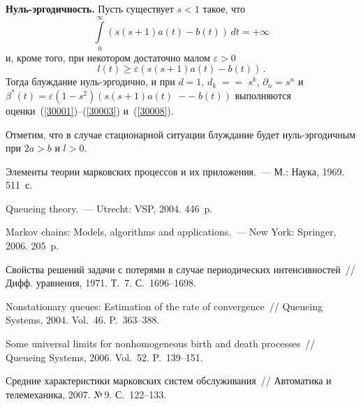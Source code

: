 \begin{multicols}{2}
{\bf Нуль-эргодичность.} Пусть существует $s<1$ такое, что
\begin{equation*}
 \int\limits_{0}^{\infty}\left(s(s+1)a(t) - b(t)\right)\, dt=+\infty
\end{equation*} 
и, кроме того, при некотором достаточно
малом $\varepsilon > 0$ 
\begin{equation*} 
l(t) \ge \varepsilon
\left(s(s+1)a(t) - b(t)\right)\,. 
\end{equation*}
Тогда блуждание  нуль-эргодично, и при $d=1$, $d_k\;=$\linebreak $=\;s^k$,
${\partial}_n = s^n$ и
$\beta^* (t)= \varepsilon \left(1-s^2\right)
\left(s(s+1)a(t)\;-{}\right.$\linebreak $\left. -\;b(t)\right)$ 
выполняются оценки~(\ref{30001})--(\ref{30003}) и~(\ref{30008}).

             \medskip

Отметим, что в случае стационарной ситуации блуждание будет
нуль-эргодичным при $2a > b$ и $l > 0$.


{\small\frenchspacing
{%
\begin{thebibliography}{99}

Элементы теории марковских  процессов и их приложения.~--- М.: Наука, 1969.
511~с.

Queueing theory.~--- Utrecht: VSP, 2004. 446~p.

Markov chains:
Models, algorithms and applications.~--- New York: Springer, 2006. 205~p.

Свойства решений
задачи с потерями в случае периодических интенсивностей~// Дифф.
уравнения, 1971. Т.~7. С.~1696--1698.

Nonstationary
queues: Estimation of the rate of convergence~// Queueing Systems,
2004. Vol.~46. P.~363--388.

 Some universal limits for nonhomogeneous birth and death processes~//
Queueing Systems, 2006. Vol.~52. P.~139--151.

Средние характеристики марковских систем обслуживания~// Автоматика и
телемеханика, 2007. №\,9. С.~122--133.


\end{thebibliography}}}
\end{multicols}
